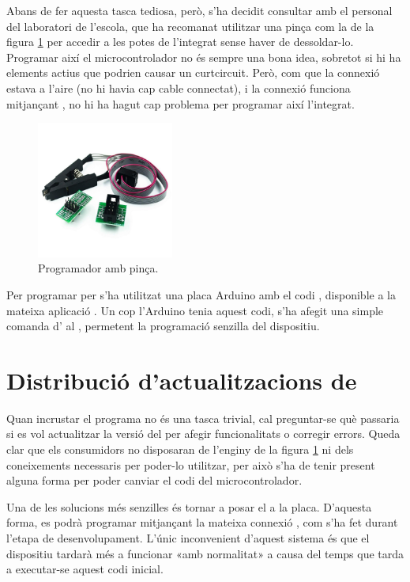 Abans de fer aquesta tasca tediosa, però, s'ha decidit consultar amb el
personal del laboratori de l'escola, que ha recomanat utilitzar una pinça com
la de la figura \ref{fig:programmer} per accedir a les potes de l'integrat sense haver
de dessoldar-lo. Programar així el microcontrolador no és sempre una bona idea,
sobretot si hi ha elements actius que podrien causar un curtcircuit. Però, com que
la connexió  estava a l'aire (no hi havia cap cable connectat), i la 
connexió  funciona mitjançant , no hi ha hagut cap 
problema per programar així l'integrat.

\begin{figure}[ht]
    \centering
    \includegraphics[width=0.4\textwidth]{images/device/programmer.jpeg}
    \caption{Programador  amb pinça.}
    \label{fig:programmer}
\end{figure}

Per programar per  s'ha utilitzat una placa Arduino amb el codi
, disponible a la mateixa aplicació 
\cite{ArduinoIsp}. Un cop
l'Arduino tenia aquest codi, s'ha afegit una simple comanda d' 
al , permetent la programació senzilla del dispositiu.

\section{Distribució d'actualitzacions de }

Quan incrustar el programa no és una tasca trivial, cal preguntar-se què
passaria si  es vol actualitzar la versió del  per afegir
funcionalitats o corregir errors. Queda clar que els consumidors no disposaran
de l'enginy de la figura \ref{fig:programmer} ni dels coneixements necessaris
per poder-lo utilitzar, per això s'ha de tenir present alguna forma per
poder canviar el codi del microcontrolador.

Una de les solucions més senzilles és tornar a posar el  a la
placa. D'aquesta forma, es podrà programar mitjançant la mateixa connexió
, com s'ha fet durant l'etapa de desenvolupament. L'únic inconvenient
d'aquest sistema és que el dispositiu tardarà més a funcionar «amb normalitat»
a causa del temps que tarda a executar-se aquest codi inicial.

